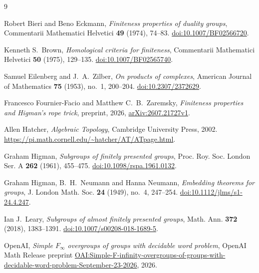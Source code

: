 \begin{thebibliography}{9}

Robert Bieri and Beno Eckmann,
\emph{Finiteness properties of duality groups},
Commentarii Mathematici Helvetici \textbf{49} (1974), 74--83.
\href{https://doi.org/10.1007/BF02566720}{doi:10.1007/BF02566720}.

Kenneth S.\ Brown,
\emph{Homological criteria for finiteness},
Commentarii Mathematici Helvetici \textbf{50} (1975), 129--135.
\href{https://doi.org/10.1007/BF02565740}{doi:10.1007/BF02565740}.

Samuel Eilenberg and J.\ A.\ Zilber,
\emph{On products of complexes},
American Journal of Mathematics \textbf{75} (1953), no.~1, 200--204.
\href{https://doi.org/10.2307/2372629}{doi:10.2307/2372629}.

Francesco Fournier-Facio and Matthew C.\ B.\ Zaremsky,
\emph{Finiteness properties and Higman's rope trick},
preprint, 2026,
\href{https://arxiv.org/abs/2607.21727v1}{arXiv:2607.21727v1}.

Allen Hatcher,
\emph{Algebraic Topology},
Cambridge University Press, 2002.
\url{https://pi.math.cornell.edu/~hatcher/AT/ATpage.html}.

Graham Higman,
\emph{Subgroups of finitely presented groups},
Proc. Roy. Soc. London Ser. A \textbf{262} (1961), 455--475.
\href{https://doi.org/10.1098/rspa.1961.0132}{doi:10.1098/rspa.1961.0132}.

Graham Higman, B.\ H.\ Neumann and Hanna Neumann,
\emph{Embedding theorems for groups},
J. London Math. Soc. \textbf{24} (1949), no.~4, 247--254.
\href{https://doi.org/10.1112/jlms/s1-24.4.247}{doi:10.1112/jlms/s1-24.4.247}.

Ian J.\ Leary,
\emph{Subgroups of almost finitely presented groups},
Math. Ann. \textbf{372} (2018), 1383--1391.
\href{https://doi.org/10.1007/s00208-018-1689-5}{doi:10.1007/s00208-018-1689-5}.

OpenAI,
\emph{Simple $F_\infty$ overgroups of groups with decidable word problem},
OpenAI Math Release preprint
\href{https://github.com/openai/math/blob/main/preprints/Simple-F-infinity-overgroups-of-groups-with-decidable-word-problem-September-23-2026/paper.pdf}{OAI:Simple-F-infinity-overgroups-of-groups-with-decidable-word-problem-September-23-2026},
2026.

\end{thebibliography}

